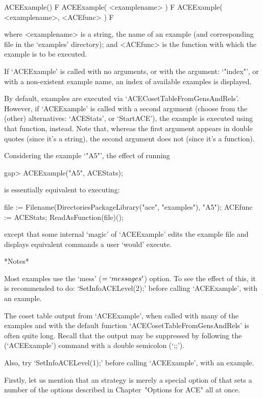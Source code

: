 \>ACEExample() F
\>ACEExample( <examplename> ) F
\>ACEExample( <examplename>, <ACEfunc> ) F

where  <examplename>  is  a  string,  the  name  of  an  example  (and
corresponding file in the `examples' directory); and <ACEfunc> is  the
{\ACE} function with which the example is to be executed.

If `ACEExample' is called with no arguments,  or  with  the  argument:
`"index"', or with a non-existent example name, an index of  available
examples is displayed.

By default, examples are executed via  `ACECosetTableFromGensAndRels'.
However, if `ACEExample' is called with a second argument (choose from
the (other) alternatives: `ACEStats', or `StartACE'), the  example  is
executed using that function, instead. Note that,  whereas  the  first
argument appears in double quotes (since it's a  string),  the  second
argument does not (since it's a function).

Considering the example `"A5"', the effect of running

\begintt
gap> ACEExample("A5", ACEStats);
\endtt

is essentially equivalent to executing:

\begintt
file := Filename(DirectoriesPackageLibrary("ace", "examples"), "A5");
ACEfunc := ACEStats;
ReadAsFunction(file)();
\endtt

except that  some  internal  \lq{}magic'  of  `ACEExample'  edits  the
example file and  displays  equivalent  commands  a  user  \lq{}would'
execute.

*Notes*

Most examples use the `mess'  ($=  `messages'$)  option.  To  see  the
effect of this, it is recommended to do: `SetInfoACELevel(2);'  before
calling `ACEExample', with an example.

The coset table output from `ACEExample', when called with many of the
examples     and     with     the     default     {\ACE}      function
`ACECosetTableFromGensAndRels' is often quite long.  Recall  that  the
output may be suppressed by following the (`ACEExample') command  with
a double semicolon (`;;').

Also, try `SetInfoACELevel(1);' before  calling `ACEExample', with  an
example.

Firstly, let us mention that an {\ACE} strategy is  merely  a  special
option of {\ACE} that sets  a  number  of  the  options  described  in
Chapter~"Options for ACE" all at once.

